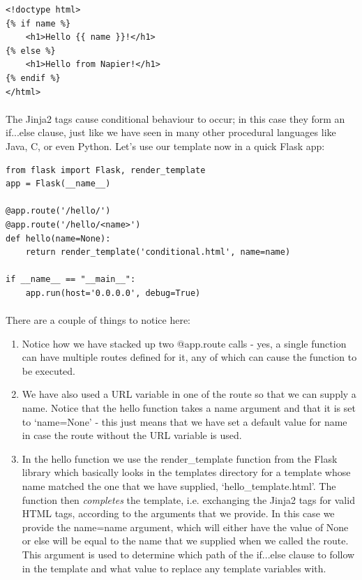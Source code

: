 \documentclass[12pt, a4paper, oneside]{book}
\begin{document}
{\begin{lstlisting}
<!doctype html>
{% if name %}
    <h1>Hello {{ name }}!</h1>
{% else %}
    <h1>Hello from Napier!</h1>
{% endif %}
</html>
\end{lstlisting}

\paragraph{} The Jinja2 tags cause conditional behaviour to occur; in this case they form an if...else clause, just like we have seen in many other procedural languages like Java, C, or even Python. Let's use our template now in a quick Flask app:

\begin{lstlisting}
from flask import Flask, render_template
app = Flask(__name__)

@app.route('/hello/')
@app.route('/hello/<name>')
def hello(name=None):
    return render_template('conditional.html', name=name)

if __name__ == "__main__":
    app.run(host='0.0.0.0', debug=True)
\end{lstlisting}

\paragraph{} There are a couple of things to notice here:
\begin{enumerate}
\item Notice how we have stacked up two @app.route calls - yes, a single function can have multiple routes defined for it, any of which can cause the function to be executed.
\item We have also used a URL variable in one of the route so that we can supply a name. Notice that the hello function takes a name argument and that it is set to `name=None' - this just means that we have set a default value for name in case the route without the URL variable is used.
\item In the hello function we use the render\_template function from the Flask library which basically looks in the templates directory for a template whose name matched the one that we have supplied, `hello\_template.html'. The function then \emph{completes} the template, i.e. exchanging the Jinja2 tags for valid HTML tags, according to the arguments that we provide. In this case we provide the name=name argument, which will either have the value of None or else will be equal to the name that we supplied when we called the route. This argument is used to determine which path of the if...else clause to follow in the template and what value to replace any template variables with.
\end{enumerate}

}
\end{document}

